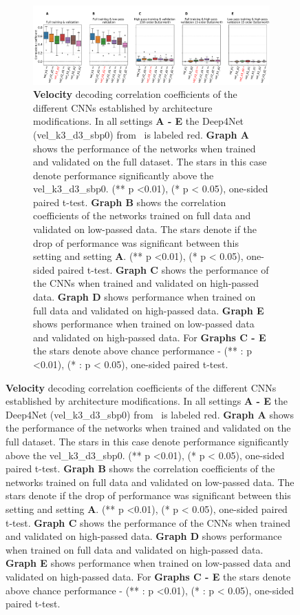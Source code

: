 \begin{itemize}
\begin{figure}[!htpb]
\centering
\begin{subfigure}[b]{\textwidth}
   \includegraphics[width=1\linewidth]{img/ch4/original_setting_vel_performance_comparison}
   \caption{\textbf{Velocity} decoding correlation coefficients of the different CNNs established by architecture modifications. In all settings \textbf{
   A - E} the Deep4Net (vel\_k3\_d3\_sbp0) from~\cite{Hammer-2021} is labeled red. \textbf{Graph A} shows the performance of the networks when trained and validated on the full dataset. The stars in this case denote performance significantly above the vel\_k3\_d3\_sbp0. (** p <0.01), (* p < 0.05), one-sided paired t-test.
   \textbf{Graph B} shows the correlation coefficients of the networks trained on full data and validated on low-passed data. 
   The stars denote if the drop of performance was significant between this setting and setting \textbf{A}. (** p <0.01), (* p < 0.05), one-sided paired t-test.
   \textbf{Graph C} shows the performance of the CNNs when trained and validated on high-passed data. \textbf{Graph D} shows performance when trained on full data and validated on high-passed data. \textbf{Graph E} shows performance when trained on low-passed data and validated on high-passed data. For \textbf{Graphs C - E} the stars denote above chance performance - (** : p <0.01), (* : p < 0.05), one-sided paired t-test.}
   \label{fig:original-performances-velocity} 
\end{subfigure}


\end{figure}
\end{itemize}
